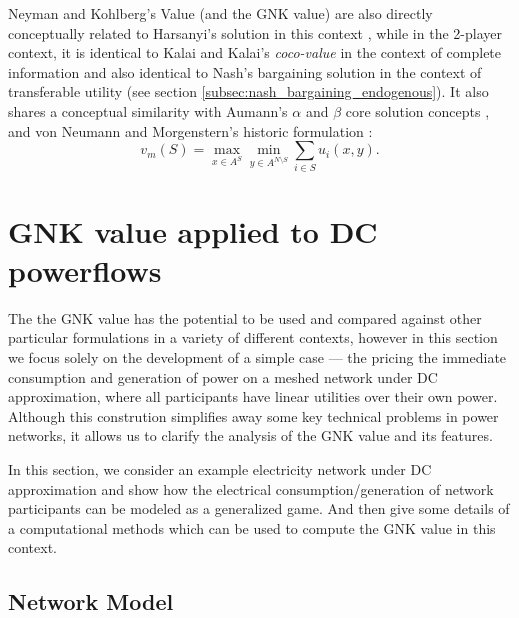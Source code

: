 Neyman and Kohlberg's Value (and the GNK value) are also directly conceptually related to Harsanyi's solution in this context \cite{values3},
while in the 2-player context, it is identical to Kalai and Kalai's \textit{coco-value} in the context of complete information \cite{kalai1,Kalai2010,value2} 
and also identical to Nash's bargaining solution in the context of transferable utility \cite{nash2,value2} (see section \ref{subsec:nash_bargaining_endogenous}).
It also shares a conceptual similarity with Aumann's $\alpha$ and $\beta$ core solution concepts \cite{aumann1961core}, and von Neumann and Morgenstern's historic formulation \cite{1944,KOHLBERG2018139,values3}:
\begin{equation}\label{knvalue3}v_m(S) = \max_{x\in A^S}\min_{y\in A^{N\setminus S}} \sum_{i\in S} u_i(x,y).\end{equation}


\section{GNK value applied to DC powerflows}\label{more_involved}

The the GNK value has the potential to be used and compared against other particular formulations in a variety of different contexts,
however in this section we focus solely on the development of a simple case --- the pricing the immediate consumption and generation of power on a meshed network under DC approximation, where all participants have linear utilities over their own power.
Although this constrution simplifies away some key technical problems in power networks, it allows us to clarify the analysis of the GNK value and its features.

In this section, we consider an example electricity network under DC approximation and show how the electrical consumption/generation of network participants can be modeled as a generalized game. And then give some details of a computational methods which can be used to compute the GNK value in this context.

\subsection{Network Model}\label{sec:the_setup}


